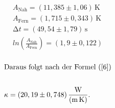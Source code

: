 \begin{align*}
    A_{\text{Nah}} = (11,385 \pm 1,06)\,\unit{\kelvin}\\
    A_{\text{Fern}} = (1,715 \pm 0,343)\,\unit{\kelvin}\\
    \increment t = (49,54 \pm 1,79)\,\unit{\second}\\
    ln\left(\frac{A_{\text{Nah}}}{A_{\text{Fern}}}\right) = (1,9 \pm 0,122)\\
\end{align*}


\begin{align*}
    \intertext{Daraus folgt nach der Formel (\ref{6})}\\
    \kappa = (20,19 \pm 0,748)\,\frac{\unit{\watt}}{(\unit{\meter\kelvin})}.\\
\end{align*}